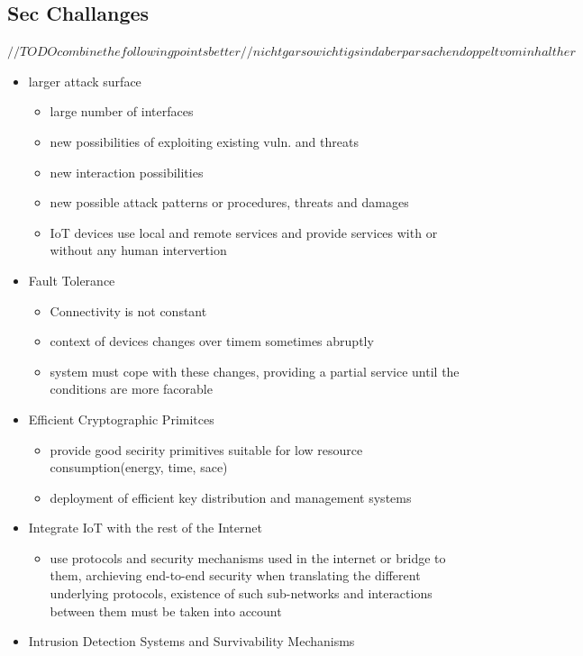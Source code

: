 \documentclass[a4paper, 12pt]{article}
\begin{document}
\subsection{Sec Challanges}
$ //TODO combine the following points better // nicht gar so wichtig sind aber par sachen doppelt vom inhalt her$
\begin{itemize}
\item larger attack surface
\begin{itemize}
\item large number of interfaces
\item new possibilities of exploiting existing vuln. and threats
\item new interaction possibilities
\item new possible attack patterns or procedures, threats and damages
\item IoT devices use local and remote services and provide services with or without any human intervertion
\end{itemize}
\item Fault Tolerance
\begin{itemize}
\item Connectivity is not constant
\item context of devices changes over timem sometimes abruptly
\item system must cope with these changes, providing a partial service until the conditions are more facorable
\end{itemize}
\item Efficient Cryptographic Primitces
\begin{itemize}
\item provide good secirity primitives suitable for low resource consumption(energy, time, sace)
\item deployment of efficient key distribution and management systems
\end{itemize}
\item Integrate IoT with the rest of the Internet
\begin{itemize}
\item use protocols and security mechanisms used in the internet or bridge to them, archieving end-to-end security when translating the different underlying protocols, existence of such sub-networks and interactions between them must be taken into account
\end{itemize}
\item Intrusion Detection Systems and Survivability Mechanisms
\begin{itemize}

\end{itemize}
\end{itemize}
\end{document}

